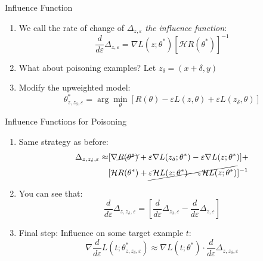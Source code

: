 \documentclass[10pt]{beamer}
\newcommand{\hessian}{\mathcal{H}\xspace}
\begin{document}
\begin{frame}[fragile]{Influence Function}

  \begin{enumerate}[<+-| alert@+>]
    \item We call the rate of change of $\Delta_{z, \varepsilon}$ \emph{the influence function}:
      \[
        \frac{d}{d\varepsilon} \Delta_{z, \varepsilon} = \nabla L(z; \theta^*) [\hessian R(\theta^*)]^{-1}
      \]
    \item What about poisoning examples? Let $z_\delta = (x + \delta, y)$
    \item Modify the upweighted model:
      \[
        \theta^*_{z, z_\delta, \varepsilon} = \arg \min_{\theta} [R(\theta) - \varepsilon L(z, \theta) +
        \varepsilon L(z_\delta, \theta)]
      \]
  \end{enumerate}

  \pause


\end{frame}


\begin{frame}[fragile]{Influence Functions for Poisoning}
  \begin{enumerate}[<+-| alert@+>]
    \item Same strategy as before:
      \[
        \begin{aligned}
          \Delta_{z, z_\delta, \varepsilon} \approx & [\nabla \cancel{R(\theta^*)} + \varepsilon \nabla L(z_\delta; \theta^*) - \varepsilon
          \nabla L(z; \theta^*)] + \\
          & [\hessian R(\theta^*) + \cancel{\varepsilon \hessian L(z; \theta^*) - \varepsilon
          \hessian L(z; \theta^*)}]^{-1}
        \end{aligned}
      \]
    \item You can see that:
      \[
        \frac{d}{d\varepsilon} \Delta_{z, z_\delta, \varepsilon} = \left[\frac{d}{d\varepsilon}
        \Delta_{z_\delta, \varepsilon} - \frac{d}{d\varepsilon} \Delta_{z, \varepsilon}\right]
      \]
    \item Final step: Influence on some target example $t$:
      \[
        \nabla \frac{d}{d\varepsilon} L(t; \theta^*_{z, z_\delta, \varepsilon}) \approx
        \nabla L(t; \theta^*) \cdot \frac{d}{d\varepsilon} \Delta_{z, z_\delta, \varepsilon}
      \]

  \end{enumerate}

  \pause

\end{frame}
\end{document}
